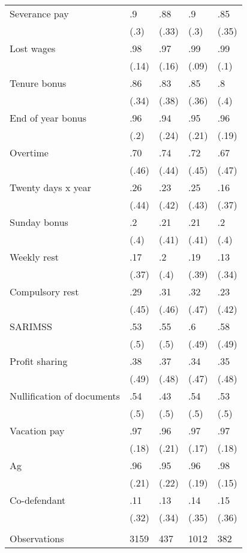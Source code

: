 \begin{tabular}{lllll}
Severance pay & .9    & .88   & .9    & .85 \\
      & (.3)  & (.33) & (.3)  & (.35) \\
Lost wages & .98   & .97   & .99   & .99 \\
      & (.14) & (.16) & (.09) & (.1) \\
Tenure bonus & .86   & .83 & .85   & .8 \\
      & (.34) & (.38) & (.36) & (.4) \\
End of year bonus & .96   & .94 & .95 & .96 \\
      & (.2)  & (.24) & (.21) & (.19) \\
Overtime & .70 & .74   & .72   & .67 \\
      & (.46) & (.44) & (.45) & (.47) \\
Twenty days x year & .26   & .23   & .25   & .16 \\
      & (.44) & (.42) & (.43) & (.37) \\
Sunday bonus & .2    & .21   & .21   & .2 \\
      & (.4)  & (.41) & (.41) & (.4) \\
Weekly rest & .17   & .2    & .19   & .13 \\
      & (.37) & (.4)  & (.39) & (.34) \\
Compulsory rest & .29   & .31   & .32   & .23 \\
      & (.45) & (.46) & (.47) & (.42) \\
SARIMSS & .53   & .55   & .6    & .58 \\
      & (.5)  & (.5)  & (.49) & (.49) \\
Profit sharing & .38   & .37   & .34   & .35 \\
      & (.49) & (.48) & (.47) & (.48) \\
Nullification of documents & .54   & .43   & .54   & .53 \\
      & (.5)  & (.5)  & (.5)  & (.5) \\
Vacation pay & .97   & .96   & .97   & .97 \\
      & (.18) & (.21) & (.17) & (.18) \\
Ag    & .96   & .95 & .96   & .98 \\
      & (.21) & (.22) & (.19) & (.15) \\
Co-defendant & .11   & .13   & .14   & .15 \\
      & (.32) & (.34) & (.35) & (.36) \\
\midrule
\midrule
      &       &       &       &  \\
Observations & 3159  & 437   & 1012  & 382 \\
\bottomrule
\end{tabular}%
